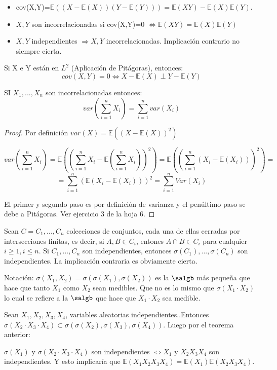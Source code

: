 \documentclass{apuntes}
\begin{document}
\begin{defn}
\begin{itemize}

\item cov(X,Y)=$\mathbb{E}((X-\mathbb{E}(X))(Y-\mathbb{E}(Y)))=\mathbb{E}(XY)-\mathbb{E}(X)\mathbb{E}(Y)$.

\item$X,Y$ son incorrelacionadas si cov(X,Y)=0 $\Leftrightarrow \mathbb{E}(XY)=\mathbb{E}(X)\mathbb{E}(Y) $

\item$X,Y$ independientes $\Rightarrow X,Y$ incorrelacionadas. Implicación contrario no siempre cierta.
\end{itemize}
\end{defn}

\obs Si X e Y están en $L^2$ (Aplicación de Pitágoras), entonces:
\[
cov(X,Y)=0 \Leftrightarrow X-\mathbb{E}(X) \perp Y - \mathbb{E}(Y)
\]

\obs SI $X_1,...,X_n$ son incorrelacionadas entonces:
\[
var(\sum_{i=1}^{n} X_i) = \sum_{i=1}^{n}var(X_i)
\]
\begin{proof}
Por definición $var(X)=\mathbb{E}((X-\mathbb{E}(X))^2)$

\[
var(\sum_{i=1}^{n} X_i) = \mathbb{E}\left((\sum_{i=1}^{n} X_i  -\mathbb{E}(\sum_{i=1}^{n}X_i))^2\right) = \mathbb{E}\left((\sum_{i=1}^{n} (X_i  -\mathbb{E}(X_i)))^2\right) =
\]
\[
= \sum_{i=1}^{n}( \mathbb{E}(X_i  -\mathbb{E}(X_i)))^2= \sum_{i=1}^{n} Var(X_i)
\]

El primer y segundo paso es por definición de varianza y el penúltimo paso se debe a Pitágoras. Ver ejercicio 3 de la hoja 6.
\end{proof}

\begin{theorem}
Sean $C=C_1,...,C_n$ colecciones de conjuntos, cada una de ellas cerradas por intersecciones finitas, es decir, si $A,B \in C_i$, entones $A \cap B \in C_i$ para cualquier $i\geq1 , i \leq n$. Si $C_1,...,C_n$ son independientes, entonces $\sigma(C_1),...,\sigma(C_n)$ son independientes. La implicación contraria es obviamente cierta.
\end{theorem}

Notación: $\sigma(X_1,X_2)=\sigma(\sigma(X_1),\sigma(X_2))$  es la $\salgb$ más pequeña que hace que tanto $X_1$ como $X_2$ sean medibles. Que no es lo mismo que $\sigma(X_1\cdot X_2)$ lo cual se refiere a la $\salgb$ que hace que $X_1\cdot X_2$ sea medible.

\begin{example}
Sean $X_1, X_2, X_3, X_4$, variables aleatorias independientes..Entonces $\sigma(X_2 \cdot X_3 \cdot X_4) \subset \sigma(\sigma(X_2),\sigma(X_3),\sigma(X_4))$. Luego por el teorema anterior:

$\sigma(X_1)$ y $\sigma(X_2 \cdot X_3 \cdot X_4)$ son independientes $\Leftrightarrow X_1 \text{ y } X_2X_3X_4$ son independientes. Y esto implicaría que $\mathbb{E}(X_1X_2X_3X_4)=\mathbb{E}(X_1)\mathbb{E}(X_2X_3X_4)$. 
\end{example}
\end{document}
